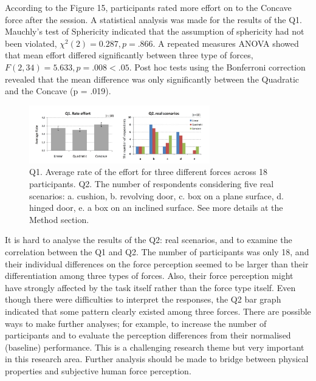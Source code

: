 According to the Figure 15, participants rated more effort on to the Concave force after the session.
A statistical analysis was made for the results of the Q1. Mauchly’s test of Sphericity indicated that the assumption of sphericity had not been violated, $\chi^2 (2) = 0.287, p = .866$. A repeated measures ANOVA showed that mean effort differed significantly between three type of forces, $F(2,34) = 5.633, p = .008 < .05$. Post hoc tests using the Bonferroni correction revealed that the mean difference was only significantly between the Quadratic and the Concave (p = .019).
%
\begin{figure}
	\centering
	\includegraphics[width=0.7\textwidth]{Chie/figs/Figure15.png}
	\caption{Q1. Average rate of the effort for three different forces across 18 participants. Q2. The number of respondents considering five real scenarios: a. cushion, b. revolving door, c. box on a plane surface, d. hinged door, e. a box on an inclined surface.  See more details at the Method section. }
	\label{questionnaire}
\end{figure}
It is hard to analyse the results of the Q2: real scenarios, and to examine the correlation between the Q1 and Q2. The number of participants was only 18, and their individual differences on the force perception seemed to be larger than their differentiation among three types of forces. Also, their force perception might have strongly affected by the task itself rather than the force type itself. Even though there were difficulties to interpret the responses, the Q2 bar graph indicated that some pattern clearly existed among three forces. There are possible ways to make further analyses; for example, to increase the number of participants and to evaluate the perception differences from their normalised (baseline) performance. This is a challenging research theme but very important in this research area. Further analysis should be made to bridge between physical properties and subjective human force perception.